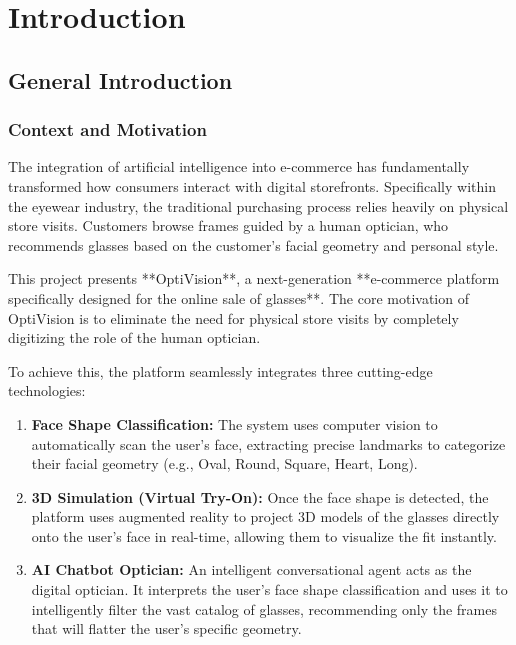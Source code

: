 \part {Introduction}
\label{chap:introduction}

\chapter{General Introduction}

\section {Context and Motivation}
\label{sec:intro_context}

The integration of artificial intelligence into e-commerce has fundamentally transformed how consumers interact with digital storefronts. Specifically within the eyewear industry, the traditional purchasing process relies heavily on physical store visits. Customers browse frames guided by a human optician, who recommends glasses based on the customer's facial geometry and personal style. 

This project presents **OptiVision**, a next-generation **e-commerce platform specifically designed for the online sale of glasses**. The core motivation of OptiVision is to eliminate the need for physical store visits by completely digitizing the role of the human optician. 

To achieve this, the platform seamlessly integrates three cutting-edge technologies:
\begin{enumerate}
    \item \textbf{Face Shape Classification:} The system uses computer vision to automatically scan the user's face, extracting precise landmarks to categorize their facial geometry (e.g., Oval, Round, Square, Heart, Long).
    \item \textbf{3D Simulation (Virtual Try-On):} Once the face shape is detected, the platform uses augmented reality to project 3D models of the glasses directly onto the user's face in real-time, allowing them to visualize the fit instantly.
    \item \textbf{AI Chatbot Optician:} An intelligent conversational agent acts as the digital optician. It interprets the user's face shape classification and uses it to intelligently filter the vast catalog of glasses, recommending only the frames that will flatter the user's specific geometry.
\end{enumerate}


